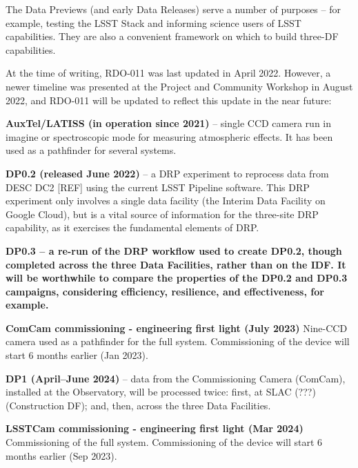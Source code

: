 The Data Previews (and early Data Releases) serve a number of purposes
-- for example, testing the LSST Stack and informing science users of
LSST capabilities. They are also a convenient framework on which
to build three-DF capabilities.

At the time of writing, RDO-011 was last updated in April
2022. However, a newer timeline was presented at the Project and
Community Workshop in August 2022, and RDO-011 will be updated to
reflect this update in the near future:

\begin{itemize}

\item {\bf AuxTel/LATISS (in operation since 2021)} -- single CCD
  camera run in imagine or spectroscopic mode for measuring
  atmospheric effects. It has been used as a pathfinder for several
  systems.
  
\item {\bf DP0.2 (released June 2022)} -- a DRP experiment to
  reprocess data from DESC DC2 [REF] using the current LSST Pipeline
  software. This DRP experiment only involves a single data facility
  (the Interim Data Facility on Google Cloud), but is a vital source
  of information for the three-site DRP capability, as it exercises
  the fundamental elements of DRP.
  
\item {\bf DP0.3 -- a re-run of the DRP workflow used to create DP0.2, though
  completed across the three Data Facilities, rather than on the IDF. It
  will be worthwhile to compare the properties of the DP0.2 and DP0.3
  campaigns, considering efficiency, resilience, and effectiveness,
  for example.

\item{\bf ComCam commissioning - engineering first light (July 2023)}
  Nine-CCD camera used as a pathfinder for the full
  system. Commissioning of the device will start 6 months earlier (Jan
  2023).
  
\item {\bf DP1 (April--June 2024)} -- data from the Commissioning
  Camera (ComCam), installed at the Observatory, will be processed
  twice: first, at SLAC (???) (Construction DF); and, then, across the
  three Data Facilities.

 \item{\bf LSSTCam commissioning - engineering first light (Mar 2024)}
   Commissioning of the full system. Commissioning of the device will
   start 6 months earlier (Sep 2023).
  
}
\end{itemize}
